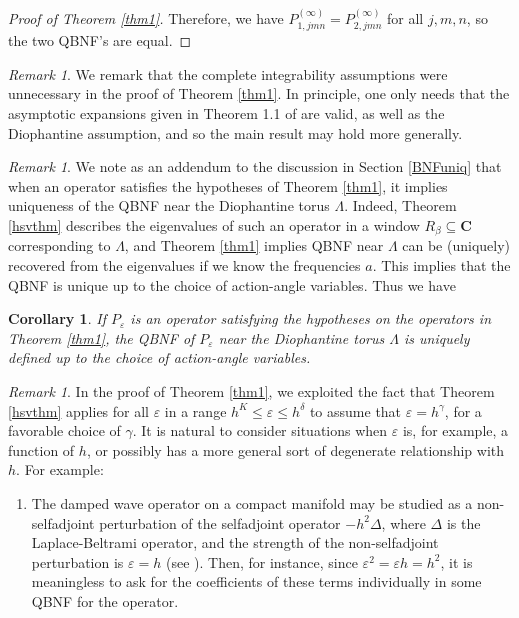 \documentclass[12pt,lettersize]{article}
\renewcommand{\epsilon}{\varepsilon}
\theoremstyle{plain}%
\newtheorem{corollary}[theorem]{Corollary}
\numberwithin{theorem}{section}
\numberwithin{equation}{section}
\theoremstyle{definition}
\theoremstyle{remark}
\newtheorem{remark}[theorem]{Remark}
\begin{document}
{\begin{proof}[Proof of Theorem \ref{thm1}]
Therefore, we have $P^{(\infty)}_{1,jmn} = P^{(\infty)}_{2,jmn}$ for all $j,m,n$, so the two QBNF's are equal. 
\end{proof}

\begin{remark}
We remark that the complete integrability assumptions were unnecessary in the proof of Theorem \ref{thm1}. In principle, one only needs that the asymptotic expansions given in Theorem 1.1 of \cite{HSV} are valid, as well as the Diophantine assumption, and so the main result may hold more generally. 
\end{remark}

\begin{remark}
We note as an addendum to the discussion in Section \ref{BNFuniq} that when an operator satisfies the hypotheses of Theorem \ref{thm1}, it implies uniqueness of the QBNF near the Diophantine torus $\Lambda$. Indeed, Theorem \ref{hsvthm} describes the eigenvalues of such an operator in a window $R_\beta\subseteq \mathbf{C}$ corresponding to $\Lambda$, and Theorem \ref{thm1} implies QBNF near $\Lambda$ can be (uniquely) recovered from the eigenvalues if we know the frequencies $a$. This implies that the QBNF is unique up to the choice of action-angle variables. Thus we have
\end{remark}
\begin{corollary}\label{coruniq}
If $P_\epsilon$ is an operator satisfying the hypotheses on the operators in Theorem \ref{thm1}, the QBNF of $P_\epsilon$ near the Diophantine torus $\Lambda$ is uniquely defined up to the choice of action-angle variables. 
\end{corollary}

\begin{remark}
In the proof of Theorem \ref{thm1}, we exploited the fact that Theorem \ref{hsvthm} applies for all $\epsilon$ in a range $h^K \leq \epsilon \leq h^\delta$ to assume that $\epsilon = h^\gamma$, for a favorable choice of $\gamma$. It is natural to consider situations when $\epsilon$ is, for example, a function of $h$, or possibly has a more general sort of degenerate relationship with $h$. For example:


\begin{enumerate}
\item The damped wave operator on a compact manifold may be studied as a non-selfadjoint perturbation of the selfadjoint operator $-h^2\Delta$, where $\Delta$ is the Laplace-Beltrami operator, and the strength of the non-selfadjoint perturbation is $\epsilon = h$ (see \cite{SjDWE}). Then, for instance, since $\epsilon^2 = \epsilon h = h^2$, it is meaningless to ask for the coefficients of these terms individually in some QBNF for the operator. 


\end{enumerate}
\end{remark}}
\end{document}
